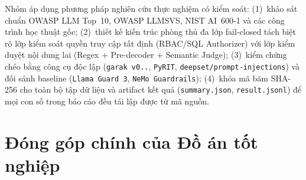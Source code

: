 Nhóm áp dụng phương pháp nghiên cứu thực nghiệm có kiểm soát: (1)~khảo sát chuẩn OWASP LLM Top~10, OWASP LLMSVS, NIST AI~600-1 và các công trình học thuật gốc; (2)~thiết kế kiến trúc phòng thủ đa lớp fail-closed tách biệt rõ lớp kiểm soát quyền truy cập tất định (RBAC/SQL Authorizer) với lớp kiểm duyệt nội dung lai (Regex + Pre-decoder + Semantic Judge); (3)~kiểm chứng chéo bằng công cụ độc lập (\texttt{garak v0..}, \texttt{PyRIT}, \texttt{deepset/\allowbreak prompt-\allowbreak injections}) và đối sánh baseline (\texttt{Llama Guard~3}, \texttt{NeMo Guardrails}); (4)~khóa mã băm SHA-256 cho toàn bộ tập dữ liệu và artifact kết quả (\texttt{summary.\allowbreak json}, \texttt{result.\allowbreak jsonl}) để mọi con số trong báo cáo đều tái lập được từ mã nguồn.

\section*{Đóng góp chính của Đồ án tốt nghiệp}


